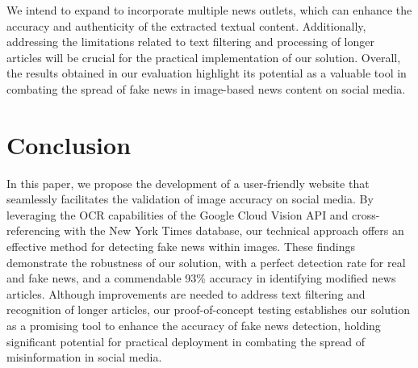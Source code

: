 \documentclass[conference]{IEEEtran}
\begin{document}
We intend to expand to incorporate multiple news outlets, which can enhance the accuracy and authenticity of the extracted textual content. Additionally, addressing the limitations related to text filtering and processing of longer articles will be crucial for the practical implementation of our solution. Overall, the results obtained in our evaluation highlight its potential as a valuable tool in combating the spread of fake news in image-based news content on social media.

\section{Conclusion}

In this paper, we propose the development of a user-friendly website that seamlessly facilitates the validation of image accuracy on social media. By leveraging the OCR capabilities of the Google Cloud Vision API and cross-referencing with the New York Times database, our technical approach offers an effective method for detecting fake news within images. These findings demonstrate the robustness of our solution, with a perfect detection rate for real and fake news, and a commendable 93\% accuracy in identifying modified news articles. Although improvements are needed to address text filtering and recognition of longer articles, our proof-of-concept testing establishes our solution as a promising tool to enhance the accuracy of fake news detection, holding significant potential for practical deployment in combating the spread of misinformation in social media.
\end{document}
